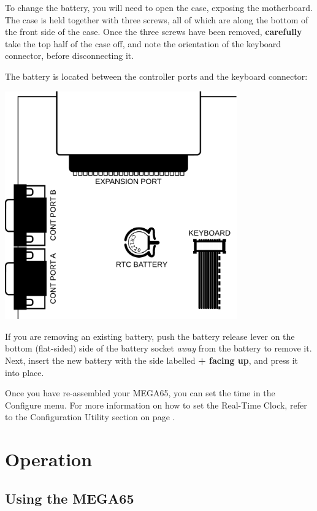 To change the battery, you will need to open the case, exposing the motherboard. The case is held together with three
screws, all of which are along the bottom of the front side of the case. Once the three screws have been removed,
{\bf carefully} take the top half of the case off, and note the orientation of the keyboard connector, before
disconnecting it.

The battery is located between the controller ports and the keyboard connector:

\includegraphics[width=10cm]{images/illustrations/rtc-battery-location.pdf}

If you are removing an existing battery, push the battery release lever on the bottom (flat-sided) side of the
battery socket \textit{away} from the battery to remove it. Next, insert the new battery with the side labelled
{\bf + facing up}, and press it into place.

Once you have re-assembled your MEGA65, you can set the time in the Configure menu. For more information on how to set
the Real-Time Clock, refer to the Configuration Utility section on page \pageref{sec:configuration-utility}.




\section{Operation}

\subsection{Using the MEGA65}

